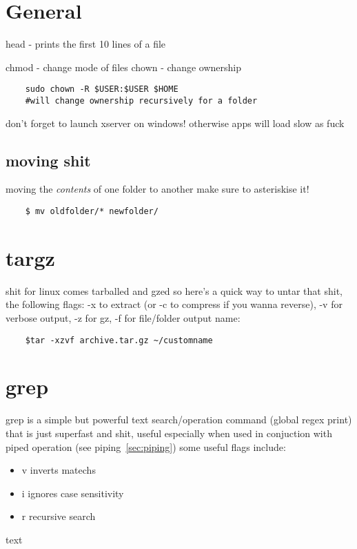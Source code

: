 \section*{General}%
\label{sec:section_name}

head - prints the first 10 lines of a file

chmod - change mode of files
chown - change ownership
\begin{verbatim}
	sudo chown -R $USER:$USER $HOME
	#will change ownership recursively for a folder
\end{verbatim}

don't forget to launch xserver on windows! otherwise apps will load slow as fuck

\subsection{moving shit}%
\label{sub:moving_shit}

moving the \textit{contents} of one folder to another make sure to asteriskise it!
\begin{verbatim}
	$ mv oldfolder/* newfolder/
\end{verbatim}

\section{targz}%
\label{sec:targz}

shit for linux comes tarballed and gzed so here's a quick way to untar that shit, the following flags: -x to extract (or -c to compress if you wanna reverse), -v for verbose output, -z for gz, -f for file/folder output name:
\begin{verbatim}
	$tar -xzvf archive.tar.gz ~/customname
\end{verbatim}
\section*{grep}%
\label{sec:grep}
grep is a simple but powerful text search/operation command (global regex print) that is just superfast and shit, useful especially when used in conjuction with piped operation (see piping~\ref{sec:piping})
some useful flags include:
\begin{itemize}
	\item v inverts matechs
	\item i ignores case sensitivity
	\item r recursive search
\end{itemize}
text
